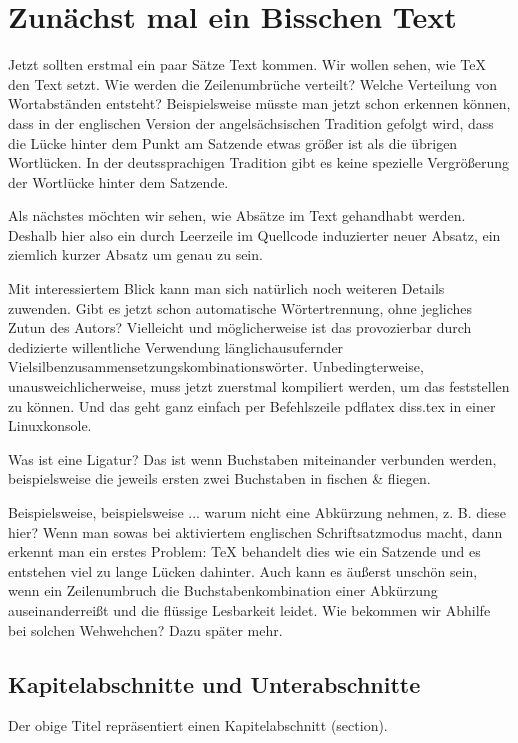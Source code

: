 \chapter{Zunächst mal ein Bisschen Text}%
Jetzt sollten erstmal ein paar Sätze Text kommen. Wir wollen sehen, wie TeX den Text setzt. Wie werden die Zeilenumbrüche verteilt? Welche Verteilung von Wortabständen entsteht? Beispielsweise müsste man jetzt schon erkennen können, dass in der englischen Version der angelsächsischen Tradition gefolgt wird, dass die Lücke hinter dem Punkt am Satzende etwas größer ist als die übrigen Wortlücken. In der deutssprachigen Tradition gibt es keine spezielle Vergrößerung der Wortlücke hinter dem Satzende.

Als nächstes möchten wir sehen, wie Absätze im Text gehandhabt werden. Deshalb hier also ein durch Leerzeile im Quellcode induzierter neuer Absatz, ein ziemlich kurzer Absatz um genau zu sein.

Mit interessiertem Blick kann man sich natürlich noch weiteren Details zuwenden. Gibt es jetzt schon automatische Wörtertrennung, ohne jegliches Zutun des Autors? Vielleicht und möglicherweise ist das provozierbar durch dedizierte willentliche Verwendung länglichausufernder Vielsilbenzusammensetzungskombinationswörter. Unbedingterweise, unausweichlicherweise, muss jetzt zuerstmal kompiliert werden, um das feststellen zu können. Und das geht ganz einfach per Befehlszeile \glqq pdflatex diss.tex\grqq{} in einer Linuxkonsole.

Was ist eine Ligatur? Das ist wenn Buchstaben miteinander verbunden werden, beispielsweise die jeweils ersten zwei Buchstaben in \glqq fischen\grqq{} \& \glqq fliegen\grqq{}.

Beispielsweise, beispielsweise ... warum nicht eine Abkürzung nehmen, z. B. diese hier? Wenn man sowas bei aktiviertem englischen Schriftsatzmodus macht, dann erkennt man ein erstes Problem: TeX behandelt dies wie ein Satzende und es entstehen viel zu lange Lücken dahinter. Auch kann es äußerst unschön sein, wenn ein Zeilenumbruch die Buchstabenkombination einer Abkürzung auseinanderreißt und die flüssige Lesbarkeit leidet. Wie bekommen wir Abhilfe bei solchen Wehwehchen? Dazu später mehr.

\section{Kapitelabschnitte und Unterabschnitte}

Der obige Titel repräsentiert einen Kapitelabschnitt (section).

